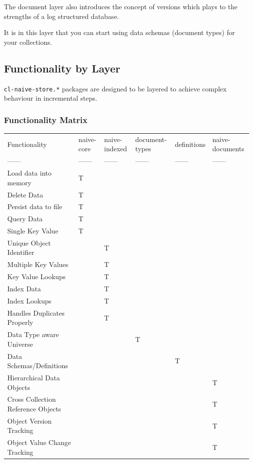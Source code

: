 \documentclass[11pt]{article}
\begin{document}
The document layer also introduces the concept of versions which plays
to the strengths of a log structured database.

It is in this layer that you can start using data schemas (document
types) for your collections.

\subsection{Functionality by Layer}
\label{sec:org668d2f8}

\texttt{cl-naive-store.*} packages are designed to be layered to achieve complex
behaviour in incremental steps.

\subsubsection{Functionality Matrix}
\label{sec:orgfee314b}

\begin{center}
\begin{tabular}{llllll}
Functionality & naive-core & naive-indexed & document-types & definitions & naive-documents\\[0pt]
------ & ------ & ------ & ------ & ------ & ------\\[0pt]
Load data into memory & T &  &  &  & \\[0pt]
Delete Data & T &  &  &  & \\[0pt]
Persist data to file & T &  &  &  & \\[0pt]
Query Data & T &  &  &  & \\[0pt]
Single Key Value & T &  &  &  & \\[0pt]
Unique Object Identifier &  & T &  &  & \\[0pt]
Multiple Key Values &  & T &  &  & \\[0pt]
Key Value Lookups &  & T &  &  & \\[0pt]
Index Data &  & T &  &  & \\[0pt]
Index Lookups &  & T &  &  & \\[0pt]
Handles Duplicates Properly &  & T &  &  & \\[0pt]
Data Type aware Universe &  &  & T &  & \\[0pt]
Data Schemas/Definitions &  &  &  & T & \\[0pt]
Hierarchical Data Objects &  &  &  &  & T\\[0pt]
Cross Collection Reference Objects &  &  &  &  & T\\[0pt]
Object Version Tracking &  &  &  &  & T\\[0pt]
Object Value Change Tracking &  &  &  &  & T\\[0pt]
\end{tabular}
\end{center}
\end{document}
